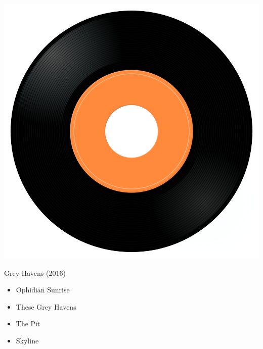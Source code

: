 \begin{minipage}[t]{0.25\textwidth}\vspace{0pt}
\captionsetup{type=figure}
\includegraphics[width=\textwidth]{Images/cover.png}
\caption*{Grey Havens (2016)}
\end{minipage}
\begin{minipage}[t]{0.25\textwidth}\vspace{0pt}
\begin{itemize}[nosep,leftmargin=1em,labelwidth=*,align=left]
	\setlength{\itemsep}{0pt}
	\item Ophidian Sunrise
	\item These Grey Havens
	\item The Pit
	\item Skyline	
\end{itemize}
\end{minipage}
